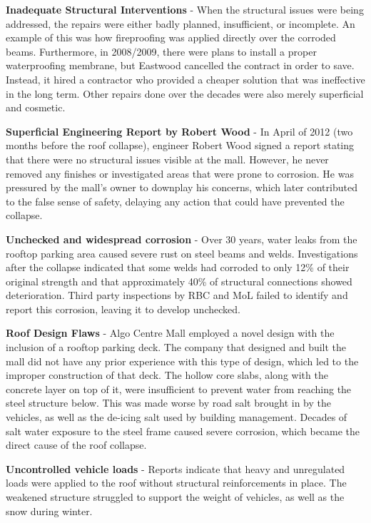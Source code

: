 \documentclass[12pt]{article}
\begin{document}
\textbf{Inadequate Structural Interventions} - When the structural issues were being addressed, the repairs were either badly planned, insufficient, or incomplete. An example of this was how fireproofing was applied directly over the corroded beams. Furthermore, in 2008/2009, there were plans to install a proper waterproofing membrane, but Eastwood cancelled the contract in order to save. Instead, it hired a contractor who provided a cheaper solution that was ineffective in the long term. Other repairs done over the decades were also merely superficial and cosmetic.

\textbf{Superficial Engineering Report by Robert Wood} - In April of 2012 (two months before the roof collapse), engineer Robert Wood signed a report stating that there were no structural issues visible at the mall. However, he never removed any finishes or investigated areas that were prone to corrosion. He was pressured by the mall's owner to downplay his concerns, which later contributed to the false sense of safety, delaying any action that could have prevented the collapse.

\textbf{Unchecked and widespread corrosion} - Over 30 years, water leaks from the rooftop parking area caused severe rust on steel beams and welds. Investigations after the collapse indicated that some welds had corroded to only 12\% of their original strength and that approximately 40\% of structural connections showed deterioration. Third party inspections by RBC and MoL failed to identify and report this corrosion, leaving it to develop unchecked. 

\textbf{Roof Design Flaws} - Algo Centre Mall employed a novel design with the inclusion of a rooftop parking deck. The company that designed and built the mall did not have any prior experience with this type of design, which led to the improper construction of that deck. The hollow core slabs, along with the concrete layer on top of it, were insufficient to prevent water from reaching the steel structure below. This was made worse by road salt brought in by the vehicles, as well as the de-icing salt used by building management. Decades of salt water exposure to the steel frame caused severe corrosion, which became the direct cause of the roof collapse. 

\textbf{Uncontrolled vehicle loads} - Reports indicate that heavy and unregulated loads were applied to the roof without structural reinforcements in place. The weakened structure struggled to support the weight of vehicles, as well as the snow during winter. 
\end{document}
